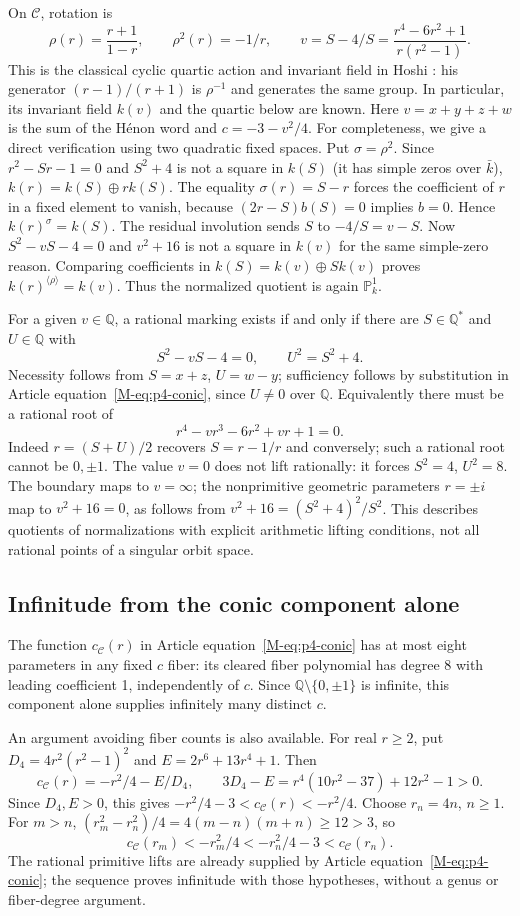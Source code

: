 \documentclass{jT}
\newcommand{\Q}{\mathbb Q}
\newcommand{\PP}{\mathbb P}
\begin{document}
On $\mathcal C$, rotation is
\[
\rho(r)=\frac{r+1}{1-r},\qquad \rho^2(r)=-1/r,\qquad
v=S-4/S=\frac{r^4-6r^2+1}{r(r^2-1)}.
\]
This is the classical cyclic quartic action and invariant field in Hoshi \cite[\S3, p.~7]{hoshi}: his generator $(r-1)/(r+1)$ is $\rho^{-1}$ and generates the same group. In particular, its invariant field $k(v)$ and the quartic below are known. Here $v=x+y+z+w$ is the sum of the H\'enon word and $c=-3-v^2/4$. For completeness, we give a direct verification using two quadratic fixed spaces. Put $\sigma=\rho^2$. Since $r^2-Sr-1=0$ and $S^2+4$ is not a square in $k(S)$ (it has simple zeros over $\bar k$), $k(r)=k(S)\oplus r k(S)$. The equality $\sigma(r)=S-r$ forces the coefficient of $r$ in a fixed element to vanish, because $(2r-S)b(S)=0$ implies $b=0$. Hence $k(r)^\sigma=k(S)$. The residual involution sends $S$ to $-4/S=v-S$. Now $S^2-vS-4=0$ and $v^2+16$ is not a square in $k(v)$ for the same simple-zero reason. Comparing coefficients in $k(S)=k(v)\oplus S k(v)$ proves $k(r)^{\langle\rho\rangle}=k(v)$. Thus the normalized quotient is again $\PP^1_k$.

For a given $v\in\Q$, a rational marking exists if and only if there are $S\in\Q^*$ and $U\in\Q$ with
\[
S^2-vS-4=0,\qquad U^2=S^2+4.
\]
Necessity follows from $S=x+z$, $U=w-y$; sufficiency follows by substitution in Article equation~\eqref{M-eq:p4-conic}, since $U\ne0$ over $\Q$. Equivalently there must be a rational root of
\[
r^4-vr^3-6r^2+vr+1=0.
\]
Indeed $r=(S+U)/2$ recovers $S=r-1/r$ and conversely; such a rational root cannot be $0,\pm1$. The value $v=0$ does not lift rationally: it forces $S^2=4$, $U^2=8$. The boundary maps to $v=\infty$; the nonprimitive geometric parameters $r=\pm i$ map to $v^2+16=0$, as follows from $v^2+16=(S^2+4)^2/S^2$. This describes quotients of normalizations with explicit arithmetic lifting conditions, not all rational points of a singular orbit space.

\subsection{Infinitude from the conic component alone}
The function $c_{\mathcal C}(r)$ in Article equation~\eqref{M-eq:p4-conic} has at most eight parameters in any fixed $c$ fiber: its cleared fiber polynomial has degree 8 with leading coefficient 1, independently of $c$. Since $\Q\setminus\{0,\pm1\}$ is infinite, this component alone supplies infinitely many distinct $c$.

An argument avoiding fiber counts is also available. For real $r\ge2$, put $D_4=4r^2(r^2-1)^2$ and $E=2r^6+13r^4+1$. Then
\[
c_{\mathcal C}(r)=-r^2/4-E/D_4,\qquad
3D_4-E=r^4(10r^2-37)+12r^2-1>0.
\]
Since $D_4,E>0$, this gives $-r^2/4-3<c_{\mathcal C}(r)<-r^2/4$. Choose $r_n=4n$, $n\ge1$. For $m>n$, $(r_m^2-r_n^2)/4=4(m-n)(m+n)\ge12>3$, so
\[
c_{\mathcal C}(r_m)<-r_m^2/4<-r_n^2/4-3<c_{\mathcal C}(r_n).
\]
The rational primitive lifts are already supplied by Article equation~\eqref{M-eq:p4-conic}; the sequence proves infinitude with those hypotheses, without a genus or fiber-degree argument.
\end{document}

